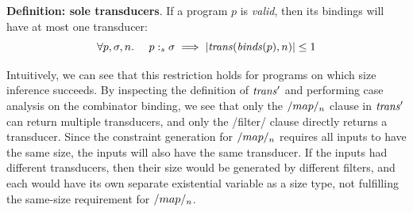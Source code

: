 \textbf{Definition: sole transducers}.
If a program $p$ is \emph{valid}, then its bindings will have at most one transducer:
\[
\forall p, \sigma, n.\ \ \ \ p :_s \sigma \implies |\mathit{trans}(\mathit{binds}(p), n)| \le 1
\]

Intuitively, we can see that this restriction holds for programs on which size inference succeeds.
By inspecting the definition of $\mathit{trans}'$ and performing case analysis on the combinator binding, we see that only the $\Hs/map/_n$ clause in $\mathit{trans}'$ can return multiple transducers, and only the \Hs/filter/ clause directly returns a transducer.
Since the constraint generation for $\Hs/map/_n$ requires all inputs to have the same size, the inputs will also have the same transducer.
If the inputs had different transducers, then their size would be generated by different filters, and each would have its own separate existential variable as a size type, not fulfilling the same-size requirement for $\Hs/map/_n$.


 
% 

